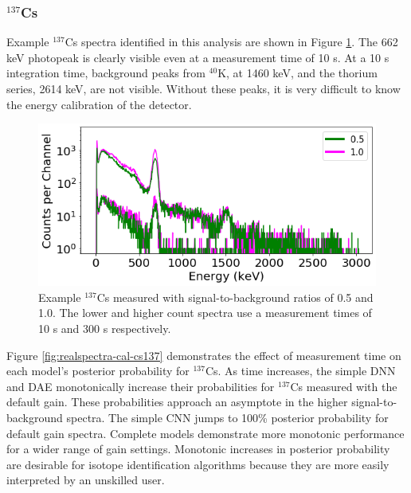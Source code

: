 \subsubsection{$^{137}$Cs}

Example $^{137}$Cs spectra identified in this analysis are shown in Figure \ref{fig:realspectra-cal-cs137-spec}. The 662 keV photopeak is clearly visible even at a measurement time of 10 s. At a 10 s integration time, background peaks from $^{40}$K, at 1460 keV, and the thorium series, 2614 keV, are not visible. Without these peaks, it is very difficult to know the energy calibration of the detector.

\begin{figure}[H]
	\centering
	\includegraphics[width=0.85\linewidth]{images/realspectra-cal-cs137-spec}
	\caption{Example $^{137}$Cs measured with signal-to-background ratios of 0.5 and 1.0. The lower and higher count spectra use a measurement times of 10 s and 300 s respectively.}
	\label{fig:realspectra-cal-cs137-spec}
\end{figure}

Figure \ref{fig:realspectra-cal-cs137} demonstrates the effect of measurement time on each model's posterior probability for $^{137}$Cs. As time increases, the simple DNN and DAE monotonically increase their probabilities for $^{137}$Cs measured with the default gain. These probabilities approach an asymptote in the higher signal-to-background spectra. The simple CNN jumps to 100\% posterior probability for default gain spectra. Complete models demonstrate more monotonic performance for a wider range of gain settings. Monotonic increases in posterior probability are desirable for isotope identification algorithms because they are more easily interpreted by an unskilled user.

